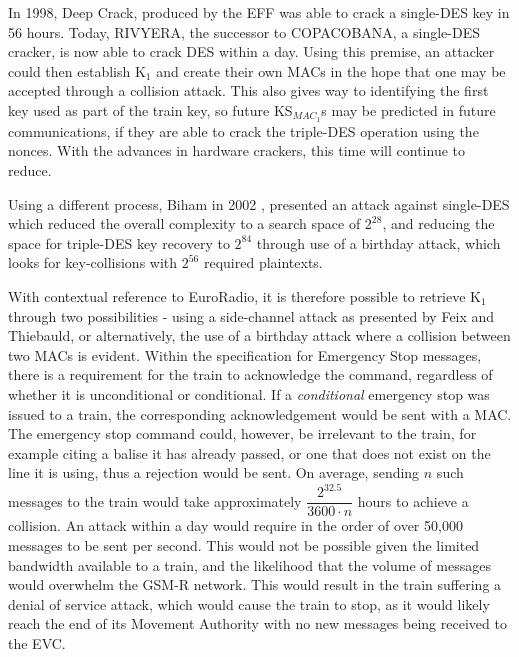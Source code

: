 \documentclass[twoside,11pt,a4paper]{article}
\begin{document}
In 1998, Deep Crack, produced by the EFF was able to crack a single-DES key in 56 hours. Today, RIVYERA, the successor to COPACOBANA, a single-DES cracker, is now able to crack DES within a day. Using this premise, an attacker could then establish K$_1$ and create their own MACs in the hope that one may be accepted through a collision attack. This also gives way to identifying the first key used as part of the train key, so future KS$_{MAC_1}$s may be predicted in future communications, if they are able to crack the triple-DES operation using the nonces. With the advances in hardware crackers, this time will continue to reduce.

Using a different process, Biham in 2002 \citep{Biham02a}, presented an attack against single-DES which reduced the overall complexity to a search space of $2^{28}$, and reducing the space for triple-DES key recovery to $2^{84}$ through use of a birthday attack, which looks for key-collisions with $2^{56}$ required plaintexts.

With contextual reference to EuroRadio, it is therefore possible to retrieve K$_1$ through two possibilities - using a side-channel attack as presented by Feix and Thiebauld, or alternatively, the use of a birthday attack where a collision between two MACs is evident. Within the specification for Emergency Stop messages, there is a requirement for the train to acknowledge the command, regardless of whether it is unconditional or conditional. If a \textit{conditional} emergency stop was issued to a train, the corresponding acknowledgement would be sent with a MAC. The emergency stop command could, however, be irrelevant to the train, for example citing a balise it has already passed, or one that does not exist on the line it is using, thus a rejection would be sent. On average, sending $n$ such messages to the train would take approximately $\dfrac{{2^{32.5}}}{{3600 \cdot n}}$ hours to achieve a collision. An attack within a day would require in the order of over 50,000 messages to be sent per second. This would not be possible given the limited bandwidth available to a train, and the likelihood that the volume of messages would overwhelm the GSM-R network. This would result in the train suffering a denial of service attack, which would cause the train to stop, as it would likely reach the end of its Movement Authority with no new messages being received to the EVC.
\end{document}

